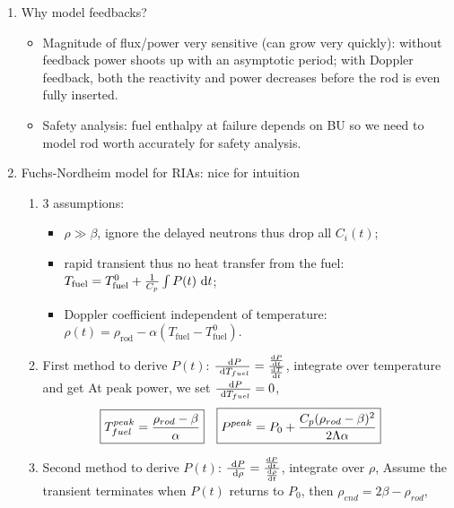 \documentclass{school-22.211-notes}
\begin{document}
\clearpage
{}
\begin{enumerate}
\item Why model feedbacks? 
  \begin{itemize}
  \item Magnitude of flux/power very sensitive (can grow very quickly): without feedback power shoots up with an asymptotic period; with Doppler feedback, both the reactivity and power decreases before the rod is even fully inserted.   
  \item Safety analysis: fuel enthalpy at failure depends on BU so we need to model rod worth accurately for safety analysis. 
  \end{itemize}

\item Fuchs-Nordheim model for RIAs: nice for intuition
  \begin{enumerate}
    \item 3 assumptions: 
      \begin{itemize}
      \item $\rho \gg \beta$, ignore the delayed neutrons thus drop all $C_i(t)$; 
      \item rapid transient thus no heat transfer from the fuel: $T_{\mathrm{fuel}} = T_{\mathrm{fuel}}^0 + \frac{1}{C_p} \int P(t) \mbox{ }\mathrm{d} t$; 
      \item Doppler coefficient independent of temperature: $\rho(t) = \rho_{\mathrm{rod}} - \alpha (T_{\mathrm{fuel}} - T_{\mathrm{fuel}}^0)$. 
      \end{itemize}
    \item First method to derive $P(t)$: $\frac{\mbox{ }\mathrm{d} P}{\mbox{ }\mathrm{d} T_{fuel}} = \frac{\frac{\mathrm{d}P}{\mathrm{d}t}}{\frac{\mathrm{d}T}{\mathrm{d}t}}$, integrate over temperature and get
      At peak power, we set $\frac{\mbox{ }\mathrm{d} P}{\mbox{ }\mathrm{d} T_{fuel}} = 0$, 
      \begin{align}
        \Aboxed{ T_{fuel}^{peak} &= \frac{\rho_{rod} - \beta}{\alpha} }  &  \Aboxed{ P^{peak} &= P_0 + \frac{C_p (\rho_{rod} - \beta)^2}{2 \Lambda \alpha} }
      \end{align}

    \item Second method to derive $P(t)$: $\frac{\mbox{ }\mathrm{d} P}{\mbox{ }\mathrm{d} \rho} = \frac{\frac{\mathrm{d}P}{\mathrm{d}t}}{\frac{\mathrm{d}\rho}{\mathrm{d}t}}$, integrate over $\rho$, 
      Assume the transient terminates when $P(t)$ returns to $P_0$, then $\rho_{end} = 2 \beta - \rho_{rod}$, 


\end{enumerate}
\end{enumerate}
\end{document}
